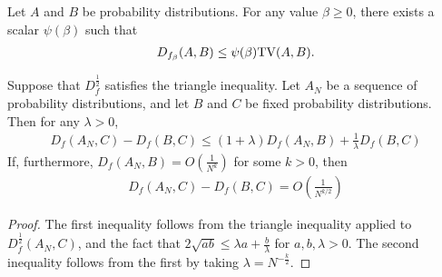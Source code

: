 \medskip

\begin{lemma}\label{lemma:f-div-betaleqtv}
Let $A$ and $B$ be probability distributions. For any value $\beta \geq 0$, there exists a scalar $\psi(\beta)$ such that
\begin{align*}
D_{f_\beta}(A,B) \leq \psi(\beta) \mathrm{TV}(A, B).
\end{align*}
\end{lemma}

\medskip


\begin{lemma}\label{lemma:hilbertian-triangle}
Suppose that $D_f^{\frac{1}{2}}$ satisfies the triangle inequality.
Let $A_N$ be a sequence of probability distributions, and let $B$ and $C$ be fixed probability distributions.
Then for any $\lambda>0$,
\begin{align*}
    D_f\left(A_N , C\right) - D_f\left(B , C\right) \leq (1+\lambda) D_f\left(A_N , B \right) +  \frac{1}{\lambda} D_f\left(B , C \right)
\end{align*}
If, furthermore, $D_f\left(A_N , B\right) = O\left( \frac{1}{N^k} \right)$ 
for some $k>0$, 
then
\begin{align*}
	D_f\left(A_N , C\right)  - D_f\left(B , C\right) = O\left( \frac{1}{N^{k/2}} \right)
\end{align*}
\end{lemma}
\begin{proof}
The first inequality follows from the triangle inequality applied to $D_f^{\frac{1}{2}}(A_N, C)$, and the fact that $2\sqrt{ab} \leq \lambda a + \frac{b}{\lambda}$ for ${a, b, \lambda>0}$.
The second inequality follows from the first by taking $\lambda = N^{-\frac{k}{2}}$.
\end{proof}





